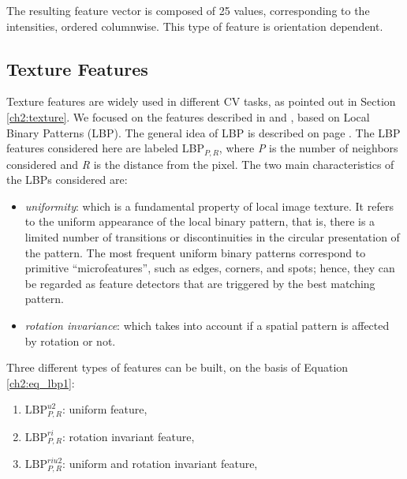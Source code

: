 The resulting feature vector is composed of 25 values, corresponding to the intensities, ordered columnwise. This type of feature is orientation dependent.



\vspace{0.5cm}

\subsection{Texture Features}
\label{ch4:tf}

Texture features are widely used in different \Gls{CV} tasks, as pointed out in Section \ref{ch2:texture}. We focused on the features described in \cite{LBP01} and \cite{LBP02},
based on Local Binary Patterns (\Gls{LBP}). The general idea of \Gls{LBP} is described on page \pageref{ch2:lbp}.
The \Gls{LBP} features considered here are labeled LBP$_{P,R}$, where \textit{P} is the number of neighbors considered and \textit{R} is the distance from the pixel.
The two main characteristics of the \Glspl{LBP} considered are:

\begin{itemize}
 \item \textit{uniformity}: which is a fundamental property of local image texture. It refers to the uniform appearance of the local
binary pattern, that is, there is a limited number of transitions or discontinuities in the circular presentation of the pattern.
The most frequent uniform binary patterns correspond to primitive \textquotedblleft microfeatures\textquotedblright, such
as edges, corners, and spots; hence, they can be regarded as feature detectors that are triggered by the best matching
pattern.
\item \textit{rotation invariance}: which takes into account if a spatial pattern is affected by rotation or not.
\end{itemize}

Three different types of features can be built, on the basis of Equation \ref{ch2:eq_lbp1}:

\begin{enumerate}
 \item $\text{LBP}_{P,R}^{u2}$: uniform feature,
 \item $\text{LBP}_{P,R}^{ri}$: rotation invariant feature,
 \item $\text{LBP}_{P,R}^{riu2}$: uniform and rotation invariant feature,
\end{enumerate}


